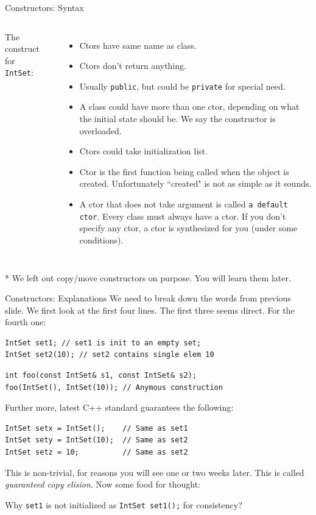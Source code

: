 \begin{frame}[fragile]{Constructors: Syntax}

\begin{columns}
	
	\vspace{-.3in}
	The construct for \texttt{IntSet}:
	\inputminted[]{c++}{code/rc8intset/intset_ctor.h}
	
	
	
	\vspace{-.65in}
	
	\begin{itemize}
		\small
		\item Ctors have same name as class.
		\item Ctors don't return anything. 
		\item Usually \texttt{public}, but could be \texttt{private} for special need.
		\item A class could have more than one ctor, depending on what the initial state should be. We say the constructor is overloaded.
		\item Ctors could take initialization list.
		\item Ctor is the first function being called when the object is created. Unfortunately ``created" is not as simple as it sounds.
		\item A ctor that does not take argument is called \texttt{a default ctor}. Every class must always have a ctor. If you don't specify \alert{any ctor}, a ctor is synthesized for you (under some conditions).
	\end{itemize}
\end{columns}
\tiny{* We left out copy/move constructors on purpose. You will learn them later.}
\end{frame}

\begin{frame}[fragile]{Constructors: Explanations}
We need to break down the words from previous slide. We first look at the first four lines. The first three seems direct. For the fourth one:
\begin{verbatim}
IntSet set1; // set1 is init to an empty set;
IntSet set2(10); // set2 contains single elem 10
\end{verbatim}

\begin{verbatim}
int foo(const IntSet& s1, const IntSet& s2);
foo(IntSet(), IntSet(10)); // Anymous construction
\end{verbatim}

Further more, latest C++ standard guarantees the following:
\begin{verbatim}
IntSet setx = IntSet();    // Same as set1 
IntSet sety = IntSet(10);  // Same as set2
IntSet setz = 10;          // Same as set2
\end{verbatim}
This is non-trivial, for reasons you will see one or two weeks later. This is called \textit{guaranteed copy elision}. Now some food for thought: 

Why \texttt{set1} is not initialized as \texttt{IntSet set1();} for consistency?
\end{frame}

